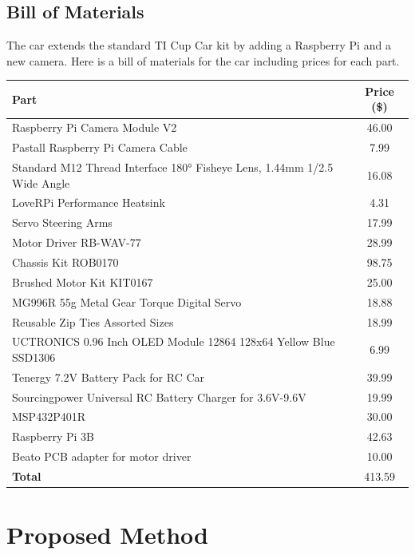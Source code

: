 \documentclass{article}
\begin{document}
\subsection{Bill of Materials}

The car extends the standard TI Cup Car kit by adding a Raspberry Pi and a new camera. Here is a bill of materials for the car including prices for each part.

\begin{table}[htb]
	\renewcommand{\arraystretch}{1.2}
	\begin{tabularx}{\columnwidth}{|>{\raggedright\arraybackslash}X|c|}
		\hline
		Part & Price (\$)\\
		\hline
		Raspberry Pi Camera Module V2 & 46.00 \\\hline
		Pastall Raspberry Pi Camera Cable & 7.99 \\\hline
		Standard M12 Thread Interface 180° Fisheye Lens, 1.44mm 1/2.5 Wide Angle & 16.08 \\\hline
		LoveRPi Performance Heatsink & 4.31\\\hline
		Servo Steering Arms & 17.99\\\hline
		Motor Driver RB-WAV-77 & 28.99\\\hline
		Chassis Kit ROB0170 & 98.75\\\hline
		Brushed Motor Kit KIT0167 & 25.00\\\hline
		MG996R 55g Metal Gear Torque Digital Servo & 18.88\\\hline
		Reusable Zip Ties Assorted Sizes & 18.99\\\hline
		UCTRONICS 0.96 Inch OLED Module 12864 128x64 Yellow Blue SSD1306 & 6.99\\\hline
		Tenergy 7.2V Battery Pack for RC Car & 39.99\\\hline
		Sourcingpower Universal RC Battery Charger for 3.6V-9.6V & 19.99\\\hline
		MSP432P401R & 30.00\\\hline
		Raspberry Pi 3B & 42.63\\\hline
		Beato PCB adapter for motor driver & 10.00\\\hline
		\textbf{Total} & 413.59 \\\hline
	\end{tabularx}
	\label{tab:bom}
\end{table}

\section{Proposed Method}
\end{document}
